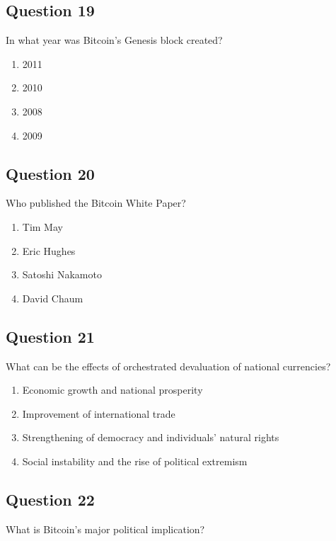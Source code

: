 \documentclass[12pt,a4paper]{article}
\begin{document}
\bigskip


\subsection*{Question 19}
In what year was Bitcoin's Genesis block created?

\begin{enumerate}[label=\Alph*., leftmargin=*]
\item 2011
\item 2010
\item 2008
\item 2009
\end{enumerate}

\bigskip


\subsection*{Question 20}
Who published the Bitcoin White Paper?

\begin{enumerate}[label=\Alph*., leftmargin=*]
\item Tim May
\item Eric Hughes
\item Satoshi Nakamoto
\item David Chaum
\end{enumerate}

\bigskip


\subsection*{Question 21}
What can be the effects of orchestrated devaluation of national currencies?

\begin{enumerate}[label=\Alph*., leftmargin=*]
\item Economic growth and national prosperity
\item Improvement of international trade
\item Strengthening of democracy and individuals' natural rights
\item Social instability and the rise of political extremism
\end{enumerate}

\bigskip


\subsection*{Question 22}
What is Bitcoin's major political implication?
\end{document}
